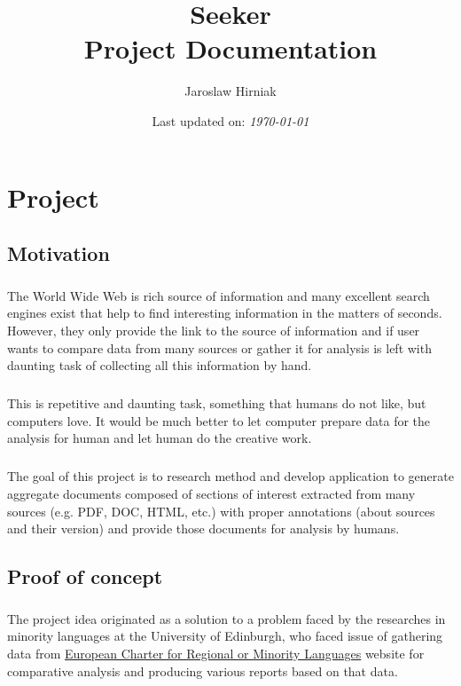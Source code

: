 \documentclass[11pt, a4paper]{report}
\title{\textbf{Seeker\\\normalsize{Project Documentation}}}
\author{Jaroslaw Hirniak}
\date{Last updated on: \emph{\today}}
\begin{document}
\maketitle

\tableofcontents

\chapter{Project}
 
\section{Motivation}
\paragraph{}
The World Wide Web is rich source of information and many excellent search engines exist that help to find interesting information in the matters of seconds. However, they only provide the link to the source of information and if user wants to compare data from many sources or gather it for analysis is left with daunting task of collecting all this information by hand.

\paragraph{}
This is repetitive and daunting task, something that humans do not like, but computers love. It would be much better to let computer prepare data for the analysis for human and let human do the creative work.

\paragraph{}
The goal of this project is to research method and develop application to generate aggregate documents composed of sections of interest extracted from many sources (e.g. PDF, DOC, HTML, etc.) with proper annotations (about sources and their version) and provide those documents for analysis by humans.

\section{Proof of concept}
\paragraph{}
The project idea originated as a solution to a problem faced by the researches in minority languages at the University of Edinburgh, who faced issue of gathering data from \href{http://www.coe.int/t/dg4/education/minlang/Report/default_en.asp}{European Charter for Regional or Minority Languages} website for comparative analysis and producing various reports based on that data.
\end{document}
